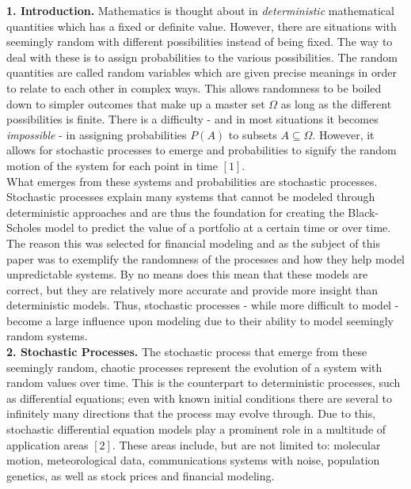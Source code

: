 \documentclass{report}
\begin{document}
	\textbf{1. Introduction.} Mathematics is thought about in \textit{deterministic} mathematical quantities which has a fixed or definite value. However, there are situations with seemingly random with different possibilities instead of being fixed. The way to deal with these is to assign probabilities to the various possibilities. The random quantities are called random variables which are given precise meanings in order to relate to each other in complex ways. This allows randomness to be boiled down to simpler outcomes that make up a master set $\Omega$ as long as the different possibilities is finite. There is a difficulty - and in most situations it becomes \textit{impossible} - in assigning probabilities $P(A)$ to subsets $A \subseteq \Omega$. However, it allows for stochastic processes to emerge and probabilities to signify the random motion of the system for each point in time $[1]$. \\
	
	What emerges from these systems and probabilities are stochastic processes. Stochastic processes explain many systems that cannot be modeled through deterministic approaches and are thus the foundation for creating the Black-Scholes model to predict the value of a portfolio at a certain time or over time. The reason this was selected for financial modeling and as the subject of this paper was to exemplify the randomness of the processes and how they help model unpredictable systems. By no means does this mean that these models are correct, but they are relatively more accurate and provide more insight than deterministic models. Thus, stochastic processes - while more difficult to model - become a large influence upon modeling due to their ability to model seemingly random systems.\\
	
	\textbf{2. Stochastic Processes.} The stochastic process that emerge from these seemingly random, chaotic processes represent the evolution of a system with random values over time. This is the counterpart to deterministic processes, such as differential equations; even with known initial conditions there are several to infinitely many directions that the process may evolve through. Due to this, stochastic differential equation models play a prominent role in a multitude of application areas $[2]$. These areas include, but are not limited to: molecular motion, meteorological data, communications systems with noise, population genetics, as well as stock prices and financial modeling. \\
	
\end{document}
